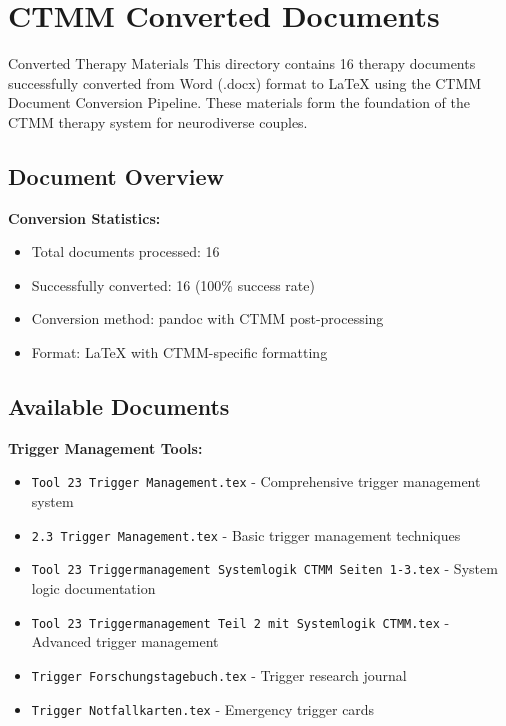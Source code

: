 
\section{CTMM Converted Documents}
\label{sec:ctmm-converted-documents}

\begin{ctmmBlueBox}{Converted Therapy Materials}
This directory contains 16 therapy documents successfully converted from Word (.docx) format to LaTeX using the CTMM Document Conversion Pipeline. These materials form the foundation of the CTMM therapy system for neurodiverse couples.
\end{ctmmBlueBox}

\subsection{Document Overview}

\textbf{Conversion Statistics:}
\begin{itemize}
    \item Total documents processed: 16
    \item Successfully converted: 16 (100\% success rate)
    \item Conversion method: pandoc with CTMM post-processing
    \item Format: LaTeX with CTMM-specific formatting
\end{itemize}

\subsection{Available Documents}

\textbf{Trigger Management Tools:}
\begin{itemize}
    \item \texttt{Tool 23 Trigger Management.tex} - Comprehensive trigger management system
    \item \texttt{2.3 Trigger Management.tex} - Basic trigger management techniques
    \item \texttt{Tool 23 Triggermanagement Systemlogik CTMM Seiten 1-3.tex} - System logic documentation
    \item \texttt{Tool 23 Triggermanagement Teil 2 mit Systemlogik CTMM.tex} - Advanced trigger management
    \item \texttt{Trigger Forschungstagebuch.tex} - Trigger research journal
    \item \texttt{Trigger Notfallkarten.tex} - Emergency trigger cards
\end{itemize}

